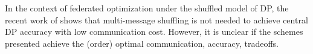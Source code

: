 \documentclass[11pt]{article}
\begin{document}
In the context of federated optimization under the shuffled model of DP, the recent work of \cite{girgis2020shuffled} shows that multi-message shuffling is not needed to achieve central DP accuracy with low communication cost. However, it is unclear if the schemes presented achieve the (order) optimal communication, accuracy, tradeoffs.  
\end{document}
